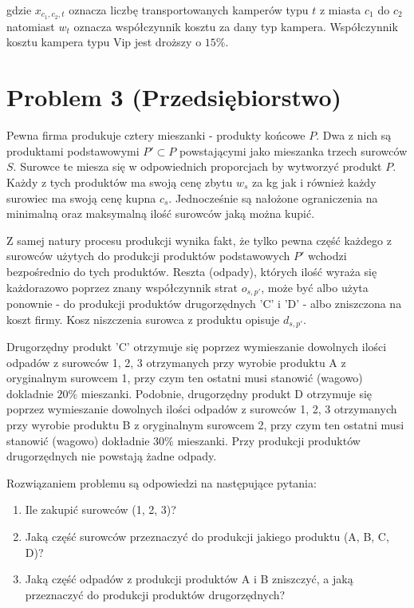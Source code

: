 \documentclass[a4paper,11pt]{article}
\theoremstyle{mytheor}
\begin{document}
gdzie $x_{c_1, c_2, t}$ oznacza liczbę transportowanych kamperów typu $t$ z miasta $c_1$ do $c_2$ natomiast $w_t$ oznacza współczynnik kosztu za dany typ kampera. Współczynnik kosztu kampera typu Vip jest droższy o $15\%$.



\section*{Problem 3 (Przedsiębiorstwo)}
Pewna firma produkuje cztery mieszanki - produkty końcowe $P$. Dwa z nich są produktami podstawowymi $P'\subset P$ powstającymi jako mieszanka trzech surowców $S$.
Surowce te miesza się w odpowiednich proporcjach by wytworzyć produkt $P$. Każdy z tych produktów ma swoją cenę zbytu $w_s$ za kg jak i również każdy surowiec ma swoją cenę kupna $c_s$. Jednocześnie są nałożone ograniczenia na minimalną oraz maksymalną ilość surowców jaką można kupić.

Z samej natury procesu produkcji wynika fakt, że tylko pewna część każdego z surowców
użytych do produkcji produktów podstawowych $P'$ wchodzi bezpośrednio do tych produktów.
Reszta (odpady), których ilość wyraża się każdorazowo poprzez znany współczynnik strat
$o_{s, p'}$, może być albo użyta ponownie - do produkcji produktów drugorzędnych 'C' i 'D' -
albo zniszczona na koszt firmy. Kosz niszczenia surowca z produktu opisuje $d_{s,p'}$.

Drugorzędny produkt 'C' otrzymuje się poprzez wymieszanie dowolnych ilości odpadów z
surowców 1, 2, 3 otrzymanych przy wyrobie produktu A z oryginalnym surowcem 1, przy
czym ten ostatni musi stanowić (wagowo) dokladnie $20\%$ mieszanki. Podobnie, drugorzędny
produkt D otrzymuje się poprzez wymieszanie dowolnych ilości odpadów z surowców 1, 2,
3 otrzymanych przy wyrobie produktu B z oryginalnym surowcem 2, przy czym ten ostatni
musi stanowić (wagowo) dokładnie $30\%$ mieszanki. Przy produkcji produktów drugorzędnych
nie powstają żadne odpady.

Rozwiązaniem problemu są odpowiedzi na następujące pytania:
\begin{enumerate}
    \item Ile zakupić surowców (1, 2, 3)?
    \item Jaką część surowców przeznaczyć do produkcji jakiego produktu (A, B, C, D)?
    \item Jaką część odpadów z produkcji produktów A i B zniszczyć, a jaką przeznaczyć do
          produkcji produktów drugorzędnych?
\end{enumerate}
\end{document}
